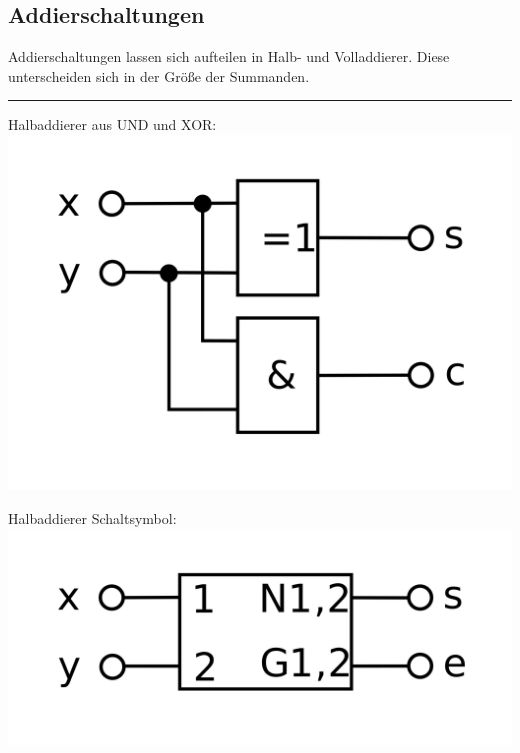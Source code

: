 \documentclass[12pt,a4paper]{article}
\begin{document}
\subsection{Addierschaltungen} %
    Addierschaltungen lassen sich aufteilen in Halb- und Volladdierer. Diese unterscheiden sich in der Größe der Summanden.
\par\noindent\rule{\textwidth}{0.4pt}
\vspace{.5cm}
\begin{minipage}[t]{.45\textwidth}
	\begin{center}
		Halbaddierer aus UND und XOR:
		\includegraphics[scale=.2]{Bilder/HalbaddiererAlternativ.png}
	\end{center}
\end{minipage}
\hspace{1cm}
\begin{minipage}[t]{.45\textwidth}
	\begin{center}
		Halbaddierer Schaltsymbol:
		\includegraphics[scale=.13]{Bilder/HalbaddiererSymbol.png}
	\end{center}
\end{minipage}
\end{document}
